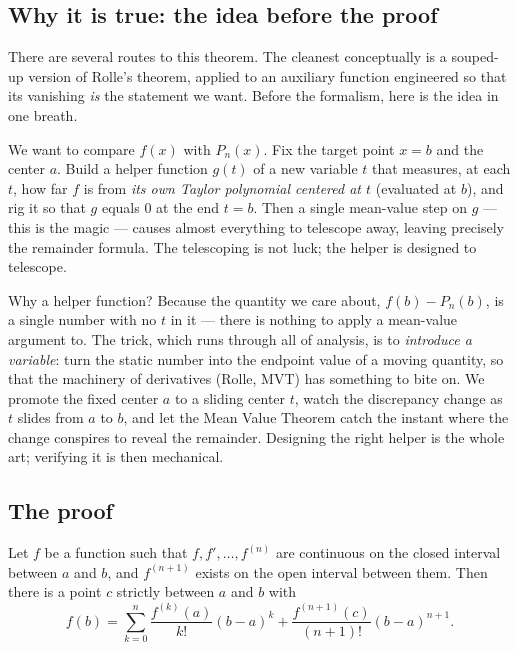 \subsection{Why it is true: the idea before the proof}

There are several routes to this theorem. The cleanest conceptually is a souped-up
version of Rolle's theorem, applied to an auxiliary function engineered so that its
vanishing \emph{is} the statement we want. Before the formalism, here is the idea in
one breath.

We want to compare $f(x)$ with $P_n(x)$. Fix the target point $x = b$ and the center
$a$. Build a helper function $g(t)$ of a new variable $t$ that measures, at each $t$,
how far $f$ is from \emph{its own Taylor polynomial centered at $t$} (evaluated at
$b$), and rig it so that $g$ equals $0$ at the end $t=b$. Then a single
mean-value step on $g$ --- this is the magic --- causes almost everything to
telescope away, leaving precisely the remainder formula. The telescoping is not
luck; the helper is designed to telescope.

\begin{whybox}
Why a helper function? Because the quantity we care about, $f(b) - P_n(b)$, is a
single number with no $t$ in it --- there is nothing to apply a mean-value argument
to. The trick, which runs through all of analysis, is to \emph{introduce a variable}:
turn the static number into the endpoint value of a moving quantity, so that the
machinery of derivatives (Rolle, MVT) has something to bite on. We promote the
fixed center $a$ to a sliding center $t$, watch the discrepancy change as $t$ slides
from $a$ to $b$, and let the Mean Value Theorem catch the instant where the change
conspires to reveal the remainder. Designing the right helper is the whole art;
verifying it is then mechanical.
\end{whybox}

\subsection{The proof}

\begin{theorem}
\label{ch31:thm-taylor}
Let $f$ be a function such that $f, f', \dots, f^{(n)}$ are continuous on the closed
interval between $a$ and $b$, and $f^{(n+1)}$ exists on the open interval between
them. Then there is a point $c$ strictly between $a$ and $b$ with
\[
  f(b) = \sum_{k=0}^{n} \frac{f^{(k)}(a)}{k!}(b-a)^k
       + \frac{f^{(n+1)}(c)}{(n+1)!}(b-a)^{n+1}.
\]
\end{theorem}

